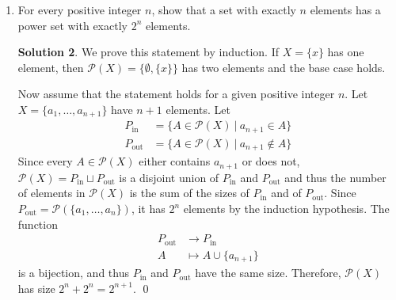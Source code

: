 \documentclass{article}
\newcommand{\PP}{\mathcal{P}}
\theoremstyle{definition}
\newtheorem*{solution}{Solution}
\begin{document}
\begin{enumerate}
\begin{solution}
Suppose that $1 + 2 + 2^2 + \dots + 2^{n-1} = 2^n - 1$.  Then
\begin{align*}
1 + 2 + 2^2 + \dots + 2^{n-1} + 2^n &= (2^n - 1) + 2^n \\
&= 2 \cdot 2^n - 1 \\
&= 2^{n+1} - 1.
\end{align*}
The result then holds by induction. \qed
\end{solution}
\item[2.12.] For every positive integer $n$, show that a set with exactly $n$ elements has a power set with exactly $2^n$ elements.
\begin{solution}
We prove this statement by induction.  If $X = \{x\}$ has one element, then $\PP(X) = \{\emptyset, \{x\}\}$ has two elements and the base case holds.

Now assume that the statement holds for a given positive integer $n$.  Let $X = \{a_1, \dots, a_{n+1}\}$ have $n+1$ elements.  Let
\begin{align*}
P_{\mathrm{in}} &= \{A \in \PP(X)\ \vert\ a_{n+1} \in A\} \\
P_{\mathrm{out}} &= \{A \in \PP(X)\ \vert\ a_{n+1} \not\in A\}
\end{align*}
Since every $A \in \PP(X)$ either contains $a_{n+1}$ or does not, $\PP(X) = P_{\mathrm{in}} \sqcup P_{\mathrm{out}}$ is a disjoint union of $P_{\mathrm{in}}$ and $P_{\mathrm{out}}$ and thus the number of elements in $\PP(X)$ is the sum of the sizes of $P_{\mathrm{in}}$ and of $P_{\mathrm{out}}$.  Since $P_{\mathrm{out}} = \PP(\{a_1, \dots, a_n\})$, it has $2^n$ elements by the induction hypothesis.  The function
\begin{align*}
P_{\mathrm{out}} &\to P_{\mathrm{in}} \\
A &\mapsto A \cup \{a_{n+1}\}
\end{align*}
is a bijection, and thus $P_{\mathrm{in}}$ and $P_{\mathrm{out}}$ have the same size.  Therefore, $\PP(X)$ has size $2^n + 2^n = 2^{n+1}$. \qed
\end{solution}
\end{enumerate}
\end{document}
